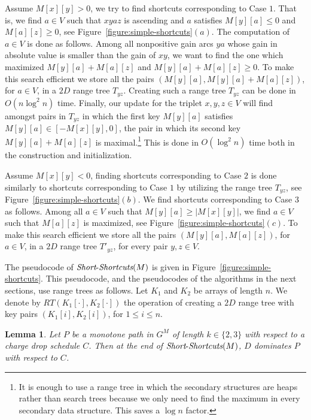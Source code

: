 \documentclass[11pt]{article}
\newtheorem{lemma}[theorem]{Lemma}
\newcommand{\Simple}{\mbox{{\it Short}-{\it Shortcuts}}}
\begin{document}
Assume $M[x][y]>0$, we try to find shortcuts corresponding to Case $1$. That is, we find $a\in V$ such that $xyaz$ is ascending and $a$ satisfies $M[y][a]\le 0$ and $M[a][z]\ge 0$, see Figure~\ref{figure:simple-shortcuts}$(a)$. The computation of $a\in V$ is done as follows. Among all nonpositive gain arcs $ya$ whose gain in absolute value is smaller than the gain of $xy$, we want to find the one which maximized
$M[y][a]+M[a][z]$ and $M[y][a]+M[a][z] \ge 0$. To make this search efficient we store all the pairs $(M[y][a], M[y][a]+M[a][z])$, for $a\in V$, in a $2D$ range tree $T_{yz}$. Creating such a range tree $T_{yz}$ can be done in $O(n\log^2 n)$ time.
Finally, our update for the triplet $x,y,z\in V$ will find amongst pairs in $T_{yz}$ in which the first key $M[y][a]$ satisfies $M[y][a]\in [-M[x][y],0]$, the pair in which its second key $M[y][a]+M[a][z]$ is maximal.\footnote{It is enough to use a range tree in which the secondary structures are heaps rather than search trees because we only need to find the maximum in every secondary data structure. This saves a $\log n$ factor.} This is done in $O(\log^2 n)$ time both in the construction and initialization.

Assume $M[x][y]<0$,
finding shortcuts corresponding to Case $2$ is done similarly to shortcuts corresponding to Case $1$ by utilizing the range tree $T_{yz}$, see Figure~\ref{figure:simple-shortcuts}$(b)$. We find shortcuts corresponding to Case $3$ as follows. Among all $a\in V$ such that $M[y][a] \ge |M[x][y]|$, we find $a\in V$ such that $M[a][z]$ is maximized, see Figure~\ref{figure:simple-shortcuts}$(c)$. To make this search efficient we store all the pairs $(M[y][a], M[a][z])$, for $a\in V$, in a $2D$ range tree $T'_{yz}$, for every pair $y,z\in V$.

The pseudocode of $\Simple(M)$ is given in Figure~\ref{figure:simple-shortcuts}. This pseudocode, and the pseudocodes of the algorithms in the next sections, use range trees as follows. Let $K_1$ and $K_2$ be arrays of length $n$. We denote by $RT(K_1[\cdot],K_2[\cdot])$ the operation of creating a $2D$ range tree with key pairs $(K_1[i],K_2[i])$, for $1\le i \le n$.

\begin{lemma}
    Let $P$ be a monotone path in $G^M$ of length $k\in\{2,3\}$ with respect to a charge drop schedule $C$. Then at the end of $\Simple(M)$, $D$ dominates $P$ with respect to $C$.
\end{lemma}
\end{document}
